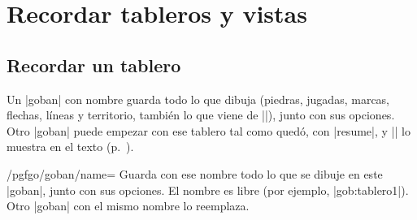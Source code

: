 \section{Recordar tableros y vistas}
\label{sec:memoria}

	\subsection{Recordar un tablero}
	\label{subsec:recordar}
	Un |goban| con nombre guarda todo lo que dibuja (piedras, jugadas, marcas, flechas, líneas y territorio, también lo que viene de |\sgf|), junto con sus opciones. Otro |goban| puede empezar con ese tablero tal como quedó, con |resume|, y |\pgfgoview| lo muestra en el texto (p.~\pageref{subsec:vistas}).

	\begin{codeexample}[]

		\begin{goban}[name = tablero1]
		\end{goban}

		\begin{goban}[resume = tablero1]
		\end{goban}

		\begin{goban}[resume = {tablero1, numbers}]
		\end{goban}
	\end{codeexample}

	\begin{key}{/pgfgo/goban/name=}
		Guarda con ese nombre todo lo que se dibuje en este |goban|, junto con sus opciones. El nombre es libre (por ejemplo, |gob:tablero1|). Otro |goban| con el mismo nombre lo reemplaza.
	\end{key}

